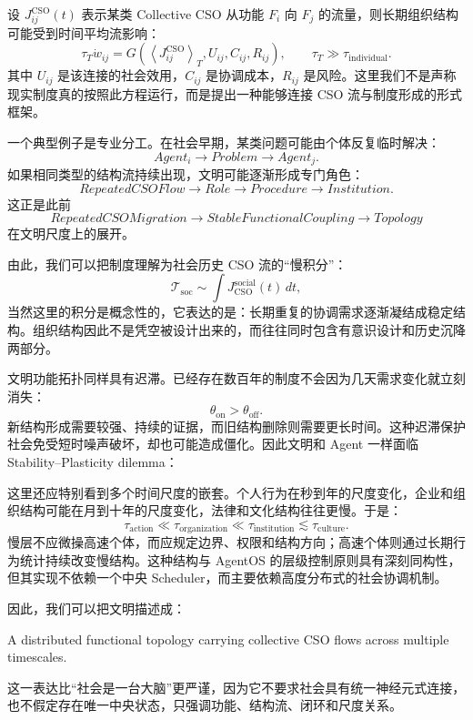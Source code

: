 设 $J_{ij}^{\mathrm{CSO}}(t)$ 表示某类 Collective CSO 从功能 $F_i$ 向 $F_j$ 的流量，则长期组织结构可能受到时间平均流影响：
\[
\tau_T
\dot w_{ij}
=
G\!\left(
\left\langle
J_{ij}^{\mathrm{CSO}}
\right\rangle_T,
U_{ij},
C_{ij},
R_{ij}
\right),
\qquad
\tau_T\gg \tau_{\mathrm{individual}}.
\]
其中 $U_{ij}$ 是该连接的社会效用，$C_{ij}$ 是协调成本，$R_{ij}$ 是风险。这里我们不是声称现实制度真的按照此方程运行，而是提出一种能够连接 CSO 流与制度形成的形式框架。

一个典型例子是专业分工。在社会早期，某类问题可能由个体反复临时解决：
\[
Agent_i
\rightarrow
Problem
\rightarrow
Agent_j.
\]
如果相同类型的结构流持续出现，文明可能逐渐形成专门角色：
\[
RepeatedCSOFlow
\rightarrow
Role
\rightarrow
Procedure
\rightarrow
Institution.
\]
这正是此前
\[
RepeatedCSOMigration
\rightarrow
StableFunctionalCoupling
\rightarrow
Topology
\]
在文明尺度上的展开。

由此，我们可以把制度理解为社会历史 CSO 流的“慢积分”：
\[
\boxed{
\mathcal T_{\mathrm{soc}}
\sim
\int
J_{\mathrm{CSO}}^{\mathrm{social}}(t)\,dt,
}
\]
当然这里的积分是概念性的，它表达的是：长期重复的协调需求逐渐凝结成稳定结构。组织结构因此不是凭空被设计出来的，而往往同时包含有意识设计和历史沉降两部分。

文明功能拓扑同样具有迟滞。已经存在数百年的制度不会因为几天需求变化就立刻消失：
\[
\theta_{\mathrm{on}}
>
\theta_{\mathrm{off}}.
\]
新结构形成需要较强、持续的证据，而旧结构删除则需要更长时间。这种迟滞保护社会免受短时噪声破坏，却也可能造成僵化。因此文明和 Agent 一样面临 Stability--Plasticity dilemma：
\begin{statementbox}
\centering
{}
\end{statementbox}

这里还应特别看到多个时间尺度的嵌套。个人行为在秒到年的尺度变化，企业和组织结构可能在月到十年的尺度变化，法律和文化结构往往更慢。于是：
\[
\tau_{\mathrm{action}}
\ll
\tau_{\mathrm{organization}}
\ll
\tau_{\mathrm{institution}}
\lesssim
\tau_{\mathrm{culture}}.
\]
慢层不应微操高速个体，而应规定边界、权限和结构方向；高速个体则通过长期行为统计持续改变慢结构。这种结构与 AgentOS 的层级控制原则具有深刻同构性，但其实现不依赖一个中央 Scheduler，而主要依赖高度分布式的社会协调机制。

因此，我们可以把文明描述成：
\begin{statementbox}
A distributed functional topology carrying collective CSO flows across multiple timescales.
\end{statementbox}
这一表达比“社会是一台大脑”更严谨，因为它不要求社会具有统一神经元式连接，也不假定存在唯一中央状态，只强调功能、结构流、闭环和尺度关系。

